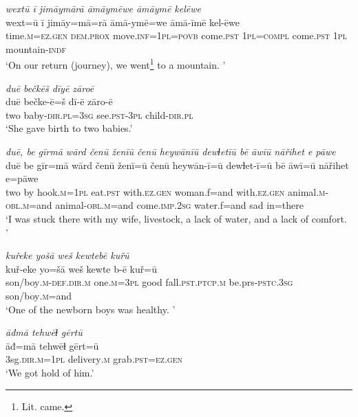 \ea \label{ZQ.11}
\textit{wextū ī jimāymārā āmāymēwe āmāymē kelēwe} \\ 
\gll wext=ū ī jimāy=mā=rā āmā-ymē=we āmā-īmē kel-ēwe \\ 
 time\textsc{.m}\textsc{=ez.gen} \textsc{dem.prox} move\textsc{.inf}\textsc{=\textsc{1pl}}\textsc{=\textsc{povb}} come\textsc{.pst} \textsc{1pl}\textsc{=compl} come\textsc{.pst} \textsc{1pl} mountain\textsc{-indf} \\ 
\glt `On our return (journey), we went\footnote{Lit. came.}  to a mountain. '
\z 
 
\ea \label{ZQ.15}
\textit{duē bečkēš dīyē zāroē} \\ 
\gll duē bečke-ē=š dī-ē zāro-ē \\ 
 two baby\textsc{-dir}\textsc{.pl}\textsc{=3sg} see\textsc{.pst}\textsc{-3pl} child\textsc{-dir}\textsc{.pl} \\ 
\glt `She gave birth to two babies.'
\z 
 
\ea \label{ZQ.16}
\textit{duē, be gīrmā wārd čenū ženīū čenū heywānīū dewɫetīū bē āwīū nāřihet e pāwe} \\ 
\gll duē be gīr=mā wārd čenū ženī=ū čenū heywān-ī=ū dewɫet-ī=ū bē āwī=ū nāřihet e=pāwe \\ 
 two by hook\textsc{.m}\textsc{=\textsc{1pl}} eat\textsc{.pst} with\textsc{.ez.gen} woman.f=and with\textsc{.ez.gen} animal\textsc{.m}\textsc{-obl}\textsc{.m}=and animal\textsc{-obl}\textsc{.m}=and come\textsc{.imp}\textsc{.\textsc{2sg}} water.f=and sad in=there \\ 
\glt `I was stuck there with my wife, livestock, a lack of water, and a lack of comfort. '
\z 
 
\ea \label{ZQ.17}
\textit{kuřeke yošā weš kewtebē kuřū} \\ 
\gll kuř-eke yo=šā weš kewte b-ē kuř=ū \\ 
 son/boy\textsc{.m}\textsc{-def}\textsc{.dir}\textsc{.m} one\textsc{.m}\textsc{=3pl} good fall\textsc{.pst}\textsc{.ptcp}\textsc{.m} be.prs\textsc{-pstc}\textsc{.3sg} son/boy\textsc{.m}=and \\ 
\glt `One of the newborn boys was healthy. '
\z 
 
\ea \label{ZQ.18}
\textit{āđmā tehwēɫ gērtū} \\ 
\gll āđ=mā tehwēɫ gērt=ū \\ 
 3sg\textsc{.dir}\textsc{.m}\textsc{=\textsc{1pl}} delivery\textsc{.m} grab\textsc{.pst}\textsc{=ez.gen} \\ 
\glt `We got hold of him.'
\z 
 
